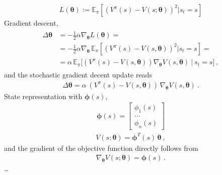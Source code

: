\documentclass[letterpaper,10pt,english]{jupyterBook}
\begin{document}
\sphinxAtStartPar
{}
\begin{equation*}
\begin{split}L(\boldsymbol{\theta}) := \mathbb{E}_{\pi} \left[ \left( V^{\pi}(s) - V(s; \boldsymbol{\theta}) \right)^2 | s_t = s  \right]\end{split}
\end{equation*}
\sphinxAtStartPar
Gradient descent,
\begin{equation*}
\begin{split}\begin{aligned}
  \Delta \boldsymbol{\theta} 
  & = - \frac{1}{2} \alpha \nabla_{\boldsymbol{\theta}} L(\boldsymbol{\theta}) = \\
  & = - \frac{1}{2} \alpha \nabla_{\boldsymbol{\theta}} \, \mathbb{E}_{\pi} \left[ \left( V^{\pi}(s) - V(s, \boldsymbol{\theta}) \right)^2 | s_t = s \right] = \\
  & = \alpha \, \mathbb{E}_{\pi} \big[ \left( V^{\pi}(s) - V(s, \boldsymbol{\theta}) \right) \nabla_{\boldsymbol{\theta}} V(s, \boldsymbol{\theta}) \ | \ s_t = s \big]  \ ,
\end{aligned}\end{split}
\end{equation*}
\sphinxAtStartPar
and the stochastic gradient decent update reads
\begin{equation*}
\begin{split}
  \Delta \boldsymbol{\theta}
  = \alpha \ \left( V^{\pi}(s) - V(s, \boldsymbol{\theta}) \right) \, \nabla_{\boldsymbol{\theta}} V(s, \boldsymbol{\theta})  \ .
\end{split}
\end{equation*}
\sphinxAtStartPar
State representation with  \(\boldsymbol{\phi}(s)\),
\begin{equation*}
\begin{split}\boldsymbol{\phi}(s) = \begin{bmatrix}  \phi_1(s) \\ \dots \\ \phi_n(s) \end{bmatrix}\end{split}
\end{equation*}
\sphinxAtStartPar
{}
\begin{equation*}
\begin{split}V(s; \boldsymbol{\theta}) = \boldsymbol{\phi}^T(s) \, \boldsymbol{\theta} \ ,\end{split}
\end{equation*}
\sphinxAtStartPar
and the gradient of the objective function directly follows from
\begin{equation*}
\begin{split}\nabla_{\boldsymbol{\theta}} V(s; \boldsymbol{\theta}) = \boldsymbol{\phi}(s) \ .\end{split}
\end{equation*}
\sphinxAtStartPar
…
\end{document}
